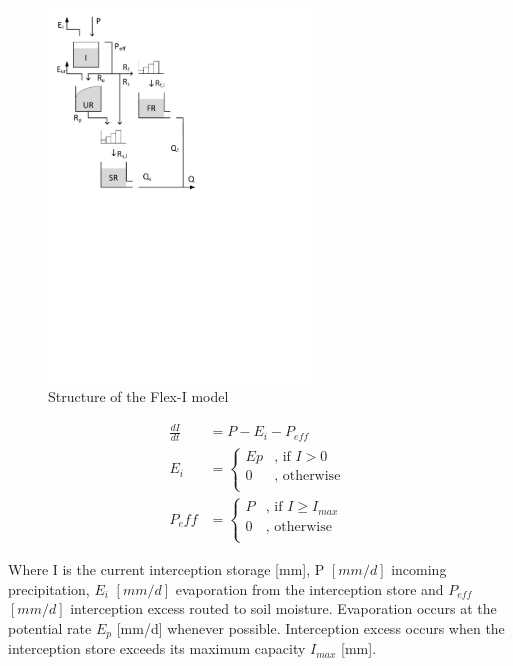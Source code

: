 { 																	%
\begin{figure}
\includegraphics[trim=1cm 15cm 7cm 1cm,width=7cm,keepaspectratio]{./AppA_files/26_schematic.pdf}
\caption{Structure of the Flex-I model} \label{fig:26_schematic}
\end{figure}

\begin{align}
	\frac{dI}{dt} &= P-E_i-P_{eff} \\
	E_i &= \begin{cases}
		Ep &\text{, if } I > 0\\
		0 &\text{, otherwise }\\
	\end{cases}\\
	P_eff &= \begin{cases}
		P &\text{, if } I \geq I_{max}\\
		0 &\text{, otherwise }\\
	\end{cases}	
\end{align}

Where I is the current interception storage [mm], P $[mm/d]$ incoming precipitation, $E_i$ $[mm/d]$ evaporation from the interception store and $P_{eff}$  $[mm/d]$ interception excess routed to soil moisture. Evaporation occurs at the potential rate $E_p$ [mm/d] whenever possible. Interception excess occurs when the interception store exceeds its maximum capacity $I_{max}$ [mm].

} %
\vspace{1cm}

